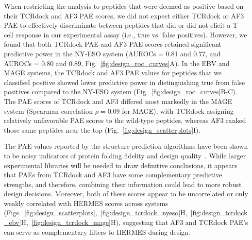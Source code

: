 When restricting the analysis to peptides that were deemed as positive based on their TCRdock and
AF3 PAE scores, we did not expect either TCRdock or AF3 PAE to effectively discriminate between
peptides that did or did not elicit a T-cell response in our experimental assay (i.e., true vs.
false positives). However, we found that both TCRdock PAE and AF3 PAE scores retained significant
predictive power in the NY-ESO system (AUROCs = 0.81 and 0.77, and AUROCs = 0.80 and 0.89,
Fig.~\ref{fig:design_roc_curves}A). In the EBV and MAGE systems, the TCRdock and AF3 PAE values for
peptides that we classified positive showed lower predictive power in distinguishing true from false
positives compared to the NY-ESO system (Fig.~\ref{fig:design_roc_curves}B-C). The PAE scores of
TCRdock and AF3 differed most markedly in the MAGE system (Spearman correlation $\rho = 0.09$ for
MAGE), with TCRdock assigning relatively unfavorable PAE scores to the wild-type peptides, whereas
AF3 ranked those same peptides near the top (Fig.~\ref{fig:design_scatterplots}I).

The PAE values reported by the structure prediction algorithms have been shown to be noisy
indicators of protein folding fidelity and design quality~\cite{Roney2022-am}. While larger
experimental libraries will be needed to draw definitive conclusions, it appears that PAEs from
TCRdock and AF3 have some complementary predictive strengths, and therefore, combining their
information could lead to more robust design decisions.
Moreover, both of these scores appear to be uncorrelated or only weakly correlated with HERMES
scores across systems
(Figs.~\ref{fig:design_scatterplots},~\ref{fig:design_tcrdock_nyeso}H,~\ref{fig:design_tcrdock_ebv}H,~\ref{fig:design_tcrdock_mage}H),
suggesting that AF3 and TCRdock PAE's can serve as complementary filters to HERMES during design.\\




